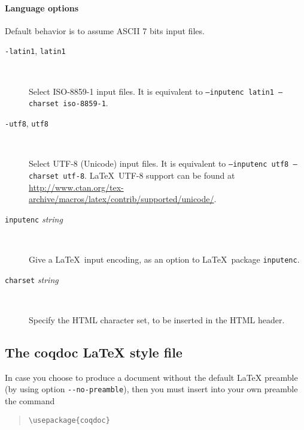 \paragraph{Language options}

Default behavior is to assume ASCII 7 bits input files.

\begin{description}

\item[\texttt{-latin1}, \texttt{\mm{}latin1}] ~\par

  Select ISO-8859-1 input files. It is equivalent to
  \texttt{--inputenc latin1 --charset iso-8859-1}.

\item[\texttt{-utf8}, \texttt{\mm{}utf8}] ~\par

  Select UTF-8 (Unicode) input files. It is equivalent to
  \texttt{--inputenc utf8 --charset utf-8}.
  \LaTeX\ UTF-8 support can be found at
 \url{http://www.ctan.org/tex-archive/macros/latex/contrib/supported/unicode/}.

\item[\texttt{\mm{}inputenc} \textit{string}] ~\par

  Give a \LaTeX\ input encoding, as an option to \LaTeX\ package
  \texttt{inputenc}. 

\item[\texttt{\mm{}charset} \textit{string}] ~\par

  Specify the HTML character set, to be inserted in the HTML header.

\end{description}



\subsection[The coqdoc \LaTeX{} style file]{The coqdoc \LaTeX{} style file\label{section:coqdoc.sty}}

In case you choose to produce a document without the default \LaTeX{}
preamble (by using option \verb|--no-preamble|), then you must insert
into your own preamble the command
\begin{quote}
  \verb|\usepackage{coqdoc}|
\end{quote}

